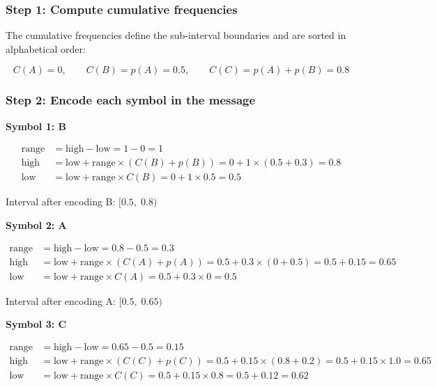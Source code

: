 \documentclass[12pt]{article}
\begin{document}
\subsubsection*{Step 1: Compute cumulative frequencies}
The cumulative frequencies define the sub-interval boundaries and are sorted in alphabetical order:

\[
C(A) = 0,\qquad C(B) = p(A) = 0.5,\qquad C(C) = p(A) + p(B) = 0.8
\]

\subsubsection*{Step 2: Encode each symbol in the message}

\textbf{Symbol 1: B}

\begin{align*}
\text{range} &= \text{high} - \text{low} = 1 - 0 = 1 \\
\text{high} &= \text{low} + \text{range} \times (C(B) + p(B)) = 0 + 1 \times (0.5 + 0.3) = 0.8 \\
\text{low} &= \text{low} + \text{range} \times C(B) = 0 + 1 \times 0.5 = 0.5
\end{align*}

Interval after encoding B: $[0.5,\; 0.8)$

\vspace{2mm}
\textbf{Symbol 2: A}

\begin{align*}
\text{range} &= \text{high} - \text{low} = 0.8 - 0.5 = 0.3 \\
\text{high} &= \text{low} + \text{range} \times (C(A) + p(A)) = 0.5 + 0.3 \times (0 + 0.5) = 0.5 + 0.15 = 0.65 \\
\text{low} &= \text{low} + \text{range} \times C(A) = 0.5 + 0.3 \times 0 = 0.5
\end{align*}

Interval after encoding A: $[0.5,\; 0.65)$

\vspace{2mm}
\textbf{Symbol 3: C}

\begin{align*}
\text{range} &= \text{high} - \text{low} = 0.65 - 0.5 = 0.15 \\
\text{high} &= \text{low} + \text{range} \times (C(C) + p(C)) = 0.5 + 0.15 \times (0.8 + 0.2) = 0.5 + 0.15 \times 1.0 = 0.65 \\
\text{low} &= \text{low} + \text{range} \times C(C) = 0.5 + 0.15 \times 0.8 = 0.5 + 0.12 = 0.62
\end{align*}
\end{document}

